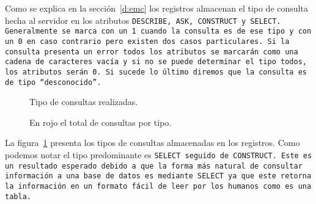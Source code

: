 Como se explica en la sección~\ref{d:emc} los registros almacenan el tipo de
consulta hecha al servidor en los atributos \tt{DESCRIBE}, \tt{ASK},
\tt{CONSTRUCT} y \tt{SELECT}. Generalmente se marca con un 1 cuando la consulta
es de ese tipo y con un 0 en caso contrario pero existen dos casos particulares.
Si la consulta presenta un error todos los atributos se marcarán como una cadena
de caracteres vacía y si no se puede determinar el tipo todos, los atributos
serán 0. Si sucede lo último diremos que la consulta es de tipo ``desconocido''.

\begin{figure}[ht]
  \caption{Tipo de consultas realizadas.}\label{fig:qtype}
  \vspace{-.2cm}
  \caption*{En rojo el total de consultas por tipo.}
\end{figure}

La figura~\ref{fig:qtype} presenta los tipos de consultas almacenadas en los
registros. Como podemos notar el tipo predominante es \tt{SELECT} seguido de
\tt{CONSTRUCT}. Este es un resultado esperado debido a que la forma más natural
de consultar información a una base de datos es mediante \tt{SELECT} ya que este
retorna la información en un formato fácil de leer por los humanos como es una
tabla.

